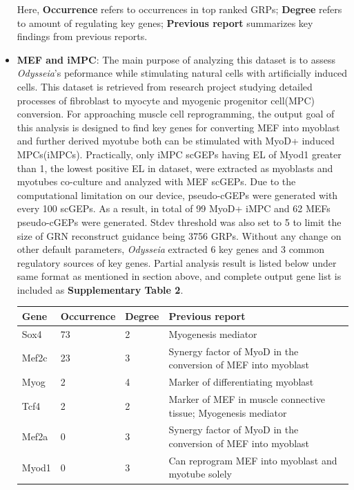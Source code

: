 \documentclass[fleqn,10pt]{wlscirep}
\begin{document}
\begin{itemize}
Here, \textbf{Occurrence} refers to occurrences in top ranked GRPs; \textbf{Degree} refers to amount of regulating key genes; \textbf{Previous report} summarizes key findings from previous reports.

\item \textbf{MEF and iMPC}:
The main purpose of analyzing this dataset is to assess \emph{Odysseia}'s peformance while stimulating natural cells with artificially induced cells.
This dataset is retrieved from research project studying detailed processes of fibroblast to myocyte and myogenic progenitor cell(MPC) conversion.\cite{mef_iMPC_ETH}
For approaching muscle cell reprogramming, the output goal of this analysis is designed to find key genes for converting MEF into myoblast and further derived myotube both can be stimulated with MyoD+ induced MPCs(iMPCs)\cite{mpc_as_myoblast}.
Practically, only iMPC scGEPs having EL of Myod1 greater than 1, the lowest positive EL in dataset, were extracted as myoblasts and myotubes co-culture and analyzed with MEF scGEPs.
Due to the computational limitation on our device, pseudo-cGEPs were generated with every 100 scGEPs.
As a result, in total of 99 MyoD+ iMPC and 62 MEFs pseudo-cGEPs were generated.
Stdev threshold was also set to 5 to limit the size of GRN reconstruct guidance being 3756 GRPs.
Without any change on other default parameters, \emph{Odysseia} extracted 6 key genes and 3 common regulatory sources of key genes.
Partial analysis result is listed below under same format as mentioned in section above, and complete output gene list is included as \textbf{Supplementary Table 2}.

\begin{table}[ht]
\centering
\begin{tabular}{|l|l|l|l|}
\hline
\textbf{Gene} & \textbf{Occurrence} & \textbf{Degree} & \textbf{Previous report}  \\
\hline
Sox4 & 73 & 2 & Myogenesis mediator\cite{sox4_2013, myogenic_repro_2018} \\
\hline
Mef2c & 23 & 3 & Synergy factor of MyoD in the conversion of MEF into myoblast\cite{mef2_2017, mef2_skeletal}\\
\hline
Myog & 2 & 4 & Marker of differentiating myoblast\cite{myog_1996, myog_2017} \\
\hline
Tcf4 & 2 & 2 & Marker of MEF in muscle connective tissue; Myogenesis mediator\cite{tcf4_2011, tcf4_2016, tcf4_2017}\\
\hline
Mef2a & 0 & 3 & Synergy factor of MyoD in the conversion of MEF into myoblast\cite{mef2_2017, mef2_skeletal}\\
\hline
Myod1 & 0 & 3 & Can reprogram MEF into myoblast and myotube solely\cite{mef_iMPC_ETH, myod_1990, myod_crispr} \\
\hline
\end{tabular}
\end{table}


\end{itemize}
\end{document}
